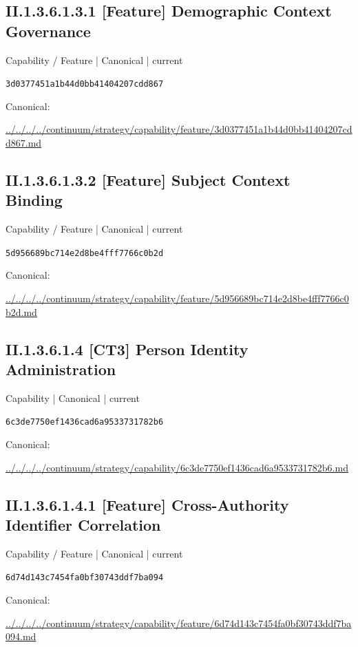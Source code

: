 \documentclass[10pt,a4paper]{article}
\begin{document}
\subsection*{II.1.3.6.1.3.1 [Feature] Demographic Context Governance}
{\small Capability / Feature | Canonical | current}\par
\texttt{3d0377451a1b44d0bb41404207cdd867}\par
Canonical: \par
{\footnotesize\url{../../../../continuum/strategy/capability/feature/3d0377451a1b44d0bb41404207cdd867.md}}\par
\subsection*{II.1.3.6.1.3.2 [Feature] Subject Context Binding}
{\small Capability / Feature | Canonical | current}\par
\texttt{5d956689bc714e2d8be4fff7766c0b2d}\par
Canonical: \par
{\footnotesize\url{../../../../continuum/strategy/capability/feature/5d956689bc714e2d8be4fff7766c0b2d.md}}\par
\subsection*{II.1.3.6.1.4 [CT3] Person Identity Administration}
{\small Capability | Canonical | current}\par
\texttt{6c3de7750ef1436cad6a9533731782b6}\par
Canonical: \par
{\footnotesize\url{../../../../continuum/strategy/capability/6c3de7750ef1436cad6a9533731782b6.md}}\par
\subsection*{II.1.3.6.1.4.1 [Feature] Cross-Authority Identifier Correlation}
{\small Capability / Feature | Canonical | current}\par
\texttt{6d74d143c7454fa0bf30743ddf7ba094}\par
Canonical: \par
{\footnotesize\url{../../../../continuum/strategy/capability/feature/6d74d143c7454fa0bf30743ddf7ba094.md}}\par
\end{document}
